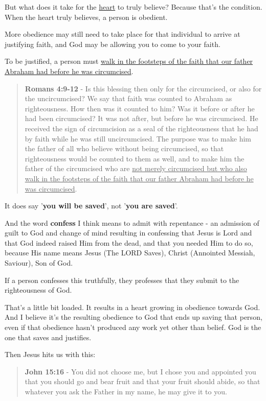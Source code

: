 \documentclass[11pt]{article}
\begin{document}
But what does it take for the \uline{heart} to truly believe? Because that's the condition. When the heart truly believes, a person is obedient.

More obedience may still need to take place for that individual to arrive at justifying faith, and God may be allowing you to come to your faith.

To be justified, a person must \uline{walk in the footsteps of the faith that our father Abraham had before he was circumcised}.

\begin{quote}
\textbf{Romans 4:9-12} - Is this blessing then only for the circumcised, or also for the uncircumcised? We say that faith was counted to Abraham as righteousness. How then was it counted to him? Was it before or after he had been circumcised? It was not after, but before he was circumcised. He received the sign of circumcision as a seal of the righteousness that he had by faith while he was still uncircumcised. The purpose was to make him the father of all who believe without being circumcised, so that righteousness would be counted to them as well, and to make him the father of the circumcised who are \uline{not merely circumcised but who also walk in the footsteps of the faith that our father Abraham had before he was circumcised}.
\end{quote}

It does say '\textbf{you will be saved}', not '\textbf{you are saved}'.

And the word \textbf{confess} I think means to admit with repentance - an admission of guilt to God and change of mind resulting in confessing that Jesus is Lord and that God indeed raised Him from the dead, and that you needed Him to do so, because His name means Jesus (The LORD Saves), Christ (Annointed Messiah, Saviour), Son of God.

If a person confesses this truthfully, they professes that they submit to the righteousness of God.

That's a little bit loaded. It results in a heart growing in obedience towards God.
And I believe it's the resulting obedience to God that ends up saving that person, even if that obedience hasn't produced any work yet other than belief. God is the one that saves and justifies.

Then Jesus hits us with this:

\begin{quote}
\textbf{John 15:16} - You did not choose me, but I chose you and appointed you that you should go and bear fruit and that your fruit should abide, so that whatever you ask the Father in my name, he may give it to you.
\end{quote}
\end{document}
